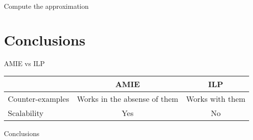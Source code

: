 \documentclass[xcolor={x11names}]{beamer}
\begin{document}
\begin{frame}{Compute the approximation}
\end{frame}

\section{Conclusions}

\begin{frame}{AMIE vs ILP}
    \begin{tabular}{ l | c | c }
        \toprule
        & AMIE & ILP \\
        \midrule
        Counter-examples & Works in the absense of them & Works with them \\
        Scalability      & Yes  & No\\
        \bottomrule
    \end{tabular}
\end{frame}

\begin{frame}{Conclusions}
\end{frame}
\end{document}
